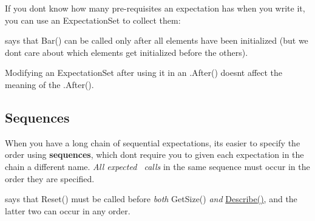 If you don\textquotesingle{}t know how many pre-\/requisites an expectation has when you write it, you can use an {\ttfamily Expectation\+Set} to collect them\+:


\begin{DoxyCode}{0}
\DoxyCodeLine{\}}
\end{DoxyCode}
 says that {\ttfamily Bar()} can be called only after all elements have been initialized (but we don\textquotesingle{}t care about which elements get initialized before the others).

Modifying an {\ttfamily Expectation\+Set} after using it in an {\ttfamily .After()} doesn\textquotesingle{}t affect the meaning of the {\ttfamily .After()}.

\subsection*{Sequences}

When you have a long chain of sequential expectations, it\textquotesingle{}s easier to specify the order using {\bfseries{sequences}}, which don\textquotesingle{}t require you to given each expectation in the chain a different name. {\itshape All expected~\newline
 calls} in the same sequence must occur in the order they are specified.


\begin{DoxyCode}{0}
\end{DoxyCode}
 says that {\ttfamily Reset()} must be called before {\itshape both} {\ttfamily Get\+Size()} {\itshape and} {\ttfamily \mbox{\hyperlink{namespacetesting_1_1gmock__matchers__test_a738a538e1705ea49670aeb3ed25108e6}{Describe()}}}, and the latter two can occur in any order.

